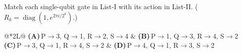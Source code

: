 \documentclass[11pt,a4paper]{article}
\newcommand{\optlabel}[1]{\textbf{(#1)}}
\newenvironment{qitem}[1]{\begin{list}{}{\setlength{\leftmargin}{3.3em}\setlength{\labelwidth}{3.1em}%
  \setlength{\labelsep}{0.2em}\setlength{\topsep}{3pt}\setlength{\parsep}{3pt}}\item[\textbf{Q.#1}\hfill]}{\end{list}}
\newcommand{\qsep}{\par\vspace{2pt}{\color{black!15}\hrule}\vspace{4pt}}
\begin{document}
\begin{qitem}{35}
Match each single-qubit gate in List-I with its action in List-II. ($R_k = \operatorname{diag}(1, e^{2\pi i/2^k})$.)
\par\smallskip{}
\par\smallskip\noindent\begin{tabularx}{\linewidth}{@{}*{2}{L}@{}}
\optlabel{A}\,P$\to$3, Q$\to$1, R$\to$2, S$\to$4 & \optlabel{B}\,P$\to$1, Q$\to$3, R$\to$4, S$\to$2 \\[3pt]
\optlabel{C}\,P$\to$3, Q$\to$1, R$\to$4, S$\to$2 & \optlabel{D}\,P$\to$4, Q$\to$1, R$\to$3, S$\to$2
\end{tabularx}
\end{qitem}
\qsep
\end{document}
